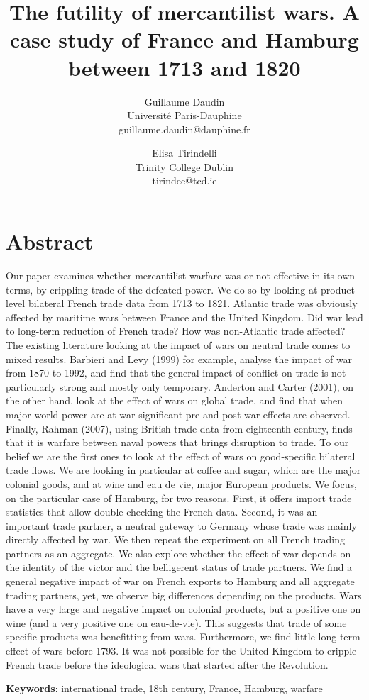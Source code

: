 \documentclass[12pt,a4paper,notitlepage]{article}
\begin{document}
\title{The futility of mercantilist wars. A case study of France and Hamburg between 1713 and 1820}
\author{
  Guillaume Daudin \\ Université Paris-Dauphine \\guillaume.daudin@dauphine.fr		
  \and
  Elisa Tirindelli \\ Trinity College Dublin  \\ tirindee@tcd.ie
}
\maketitle

\section*{Abstract}
Our paper examines whether mercantilist warfare was or not effective in its own terms, by crippling trade of the defeated power. We do so by looking at product-level bilateral French  trade data from 1713 to 1821. Atlantic trade was obviously affected by maritime wars between France and the United Kingdom. Did war lead to long-term reduction of French trade? How was non-Atlantic trade affected?
The existing literature looking at the impact of wars on neutral trade comes to mixed results. Barbieri and Levy (1999) for example, analyse the impact of war from 1870 to 1992, and find that the general impact of conflict on trade is not particularly strong and mostly only temporary. Anderton and Carter (2001), on the other hand, look at the effect of wars on global trade, and find that when major world power are at war significant pre and post war effects are observed. Finally, Rahman (2007), using British trade data from eighteenth century, finds that it is warfare between naval powers that brings disruption to trade. 
To our belief we are the first ones to look at the effect of wars on good-specific bilateral trade flows. We are looking in particular at coffee and sugar, which are the major colonial goods, and at wine and eau de vie, major European products. We focus, on the particular case of Hamburg, for two reasons. First, it offers import trade statistics that allow double checking the French data. Second, it was an important trade partner, a neutral gateway to Germany whose trade was mainly directly affected by war. We then repeat the experiment on all French trading partners as an aggregate. We also explore whether the effect of war depends on the identity of the victor and the belligerent status of trade partners.
We find a general negative impact of war on French exports to Hamburg and all aggregate trading partners, yet, we observe big differences depending on the products. Wars have a very large and negative impact on colonial products, but a positive one on wine (and a very positive one on eau-de-vie). This suggests that trade of some specific products was benefitting from wars. Furthermore, we find little long-term effect of wars before 1793. It was not possible for the United Kingdom to cripple French trade before the ideological wars that started after the Revolution. 

\textbf{Keywords}: international trade, 18th century, France, Hamburg, warfare
\end{document}
